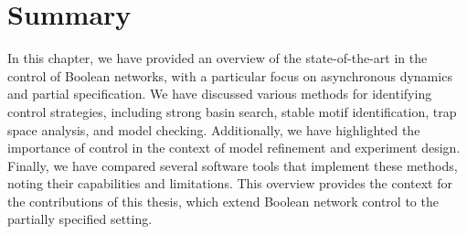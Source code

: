 \section{Summary}
\label{sec:sota_summary}

In this chapter, we have provided an overview of the state-of-the-art in the control of Boolean networks, with a particular focus on asynchronous dynamics and partial specification. We have discussed various methods for identifying control strategies, including strong basin search, stable motif identification, trap space analysis, and model checking. Additionally, we have highlighted the importance of control in the context of model refinement and experiment design. Finally, we have compared several software tools that implement these methods, noting their capabilities and limitations. This overview provides the context for the contributions of this thesis, which extend Boolean network control to the partially specified setting.


